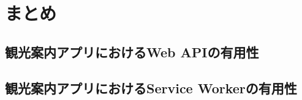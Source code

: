 \section{まとめ}\label{section:まとめ}
\subsection{観光案内アプリにおけるWeb APIの有用性}\label{subsection:観光案内アプリにおけるWeb APIの有用性}


\subsection{観光案内アプリにおけるService Workerの有用性}\label{subsection:観光案内アプリにおけるService Workerの有用性}